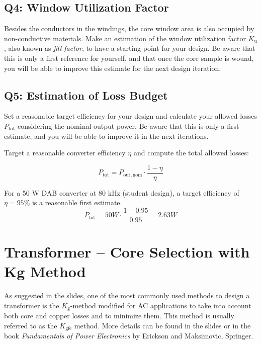 \documentclass{PELsmallreport}
\begin{document}
\subsection{Q4: Window Utilization Factor} 
Besides the conductors in the windings, the core window area is also occupied by non-conductive materials. 
Make an estimation of the window utilization factor $K_\mathrm{u}$, also known as \textit{fill factor}, to have a starting point for your design. 
Be aware that this is only a first reference for yourself, and that once the core sample is wound, you will be able to improve this estimate for the next design iteration. \\

 \hfill{}



\subsection{Q5: Estimation of Loss Budget} 
Set a reasonable target efficiency for your design and calculate your allowed losses  $P_\mathrm{tot}$ considering the nominal output power. 
Be aware that this is only a first estimate, and you will be able to improve it in the next iterations. \\

\begin{framed}
	\vspace{2em}
	Target a reasonable converter efficiency $\eta$ and compute the total allowed losses:

$$P_\mathrm{tot} = P_\mathrm{out,nom} \cdot \frac{1 - \eta}{\eta}$$

For a 50 W DAB converter at 80 kHz (student design), a target efficiency of $\eta = 95\%$ is a reasonable first estimate.
$$P_\mathrm{tot} = 50 W\cdot \frac{1 - 0.95}{0.95} = 2.63 W$$
	\vspace{2em}
\end{framed}

 \hfill{}







\newpage
\section{Transformer -- Core Selection with Kg Method}


As suggested in the slides, one of the most commonly used methods to design a transformer is the $K_\mathrm{g}$-method modified for AC applications to take into account both core and copper losses and to minimize them. 
This method is usually referred to as the $K_\mathrm{gfe}$ method. 
More details can be found in the slides or in the book \textit{Fundamentals of Power Electronics} by Erickson and Maksimovic, Springer. 
\\
\end{document}
